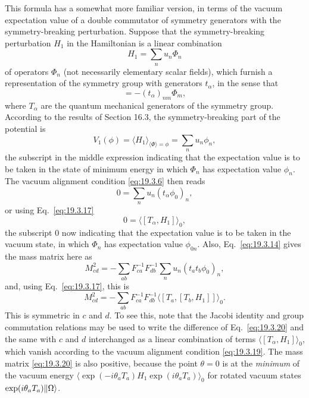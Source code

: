 This formula has a somewhat more familiar version, in terms of the vacuum expectation value of a double commutator of symmetry generators with the symmetry-breaking perturbation. Suppose that the symmetry-breaking perturbation $H_1$ in the Hamiltonian is a linear combination
\begin{equation}
H_1=\sum_n u_n\Phi_n
\tag{19.3.16}\label{eq:19.3.16}
\end{equation}
of operators $\Phi_n$ (not necessarily elementary scalar fields), which furnish a representation of the symmetry group with generators $t_\alpha$, in the sense that
\begin{equation}
[T_\alpha,\Phi_n]=-(t_\alpha)_{nm}\Phi_m,
\tag{19.3.17}\label{eq:19.3.17}
\end{equation}
where $T_\alpha$ are the quantum mechanical generators of the symmetry group. According to the results of Section 16.3, the symmetry-breaking part of the potential is
\begin{equation}
V_1(\phi)=\langle H_1\rangle_{\langle\Phi\rangle=\phi}
=\sum_n u_n\phi_n,
\tag{19.3.18}\label{eq:19.3.18}
\end{equation}
the subscript in the middle expression indicating that the expectation value is to be taken in the state of minimum energy in which $\Phi_n$ has expectation value $\phi_n$. The vacuum alignment condition \eqref{eq:19.3.6} then reads
\[
0=\sum_n u_n(t_\alpha\phi_0)_n,
\]
or using Eq.~\eqref{eq:19.3.17}
\begin{equation}
0=\langle[T_\alpha,H_1]\rangle_0,
\tag{19.3.19}\label{eq:19.3.19}
\end{equation}
the subscript $0$ now indicating that the expectation value is to be taken in the vacuum state, in which $\Phi_n$ has expectation value $\phi_{0n}$. Also, Eq.~\eqref{eq:19.3.14} gives the mass matrix here as
\[
M_{cd}^2=-\sum_{ab}F_{ca}^{-1}F_{db}^{-1}
\sum_n u_n(t_at_b\phi_0)_n,
\]
and, using Eq.~\eqref{eq:19.3.17}, this is
\begin{equation}
M_{cd}^2=-\sum_{ab}F_{ca}^{-1}F_{db}^{-1}
\langle[T_a,[T_b,H_1]]\rangle_0.
\tag{19.3.20}\label{eq:19.3.20}
\end{equation}
This is symmetric in $c$ and $d$. To see this, note that the Jacobi identity and group commutation relations may be used to write the difference of Eq.~\eqref{eq:19.3.20} and the same with $c$ and $d$ interchanged as a linear combination of terms $\langle[T_\alpha,H_1]\rangle_0$, which vanish according to the vacuum alignment condition \eqref{eq:19.3.19}. The mass matrix \eqref{eq:19.3.20} is also positive, because the point $\theta=0$ is at the \emph{minimum} of the vacuum energy $\langle\exp(-i\theta_aT_a)H_1\exp(i\theta_aT_a)\rangle_0$ for rotated vacuum states $\exp(i\theta_aT_a)\lVert \Omega\rangle$.
